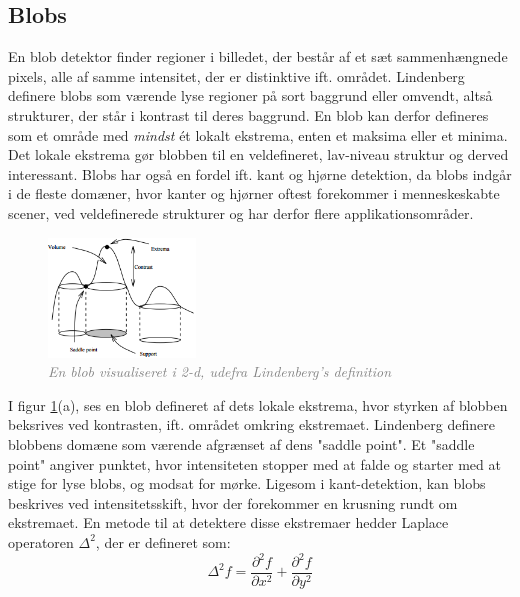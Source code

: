 \subsection{Blobs}
En blob detektor finder regioner i billedet, der består af et sæt sammenhængnede pixels, alle af samme intensitet, der er distinktive ift. området. Lindenberg \cite{blob} definere blobs som værende lyse regioner på sort baggrund eller omvendt, altså strukturer, der står i kontrast til deres baggrund. En blob kan derfor defineres som et område med \emph{mindst} ét lokalt ekstrema, enten et maksima eller et minima. Det lokale ekstrema gør blobben til en veldefineret, lav-niveau struktur og derved interessant. Blobs har også en fordel ift. kant og hjørne detektion, da blobs indgår i de fleste domæner, hvor kanter og hjørner oftest forekommer i menneskeskabte scener, ved veldefinerede strukturer og har derfor flere applikationsområder.
\begin{figure}[H]
    \centering
    \includegraphics[width=0.35\textwidth]{fig/11.png}
    \vspace{-0.5em}   
    \begin{center}
    \caption{\textcolor{gray}{\footnotesize \textit{
    En blob visualiseret i 2-d, udefra Lindenberg's definition \cite{blob}}}}
    \label{fig:lindblob}
     \end{center}
  \end{figure}
       \vspace{-2.7em}
\noindent
I figur \ref{fig:lindblob}(a), ses en blob defineret af dets lokale ekstrema, hvor styrken af blobben beksrives ved kontrasten, ift. området omkring ekstremaet. Lindenberg definere blobbens domæne som værende afgrænset af dens "saddle point". Et "saddle point" angiver punktet, hvor intensiteten stopper med at falde og starter med at stige for lyse blobs, og modsat for mørke. Ligesom i kant-detektion, kan blobs beskrives ved intensitetsskift, hvor der forekommer en krusning rundt om ekstremaet. En metode til at detektere disse ekstremaer hedder Laplace operatoren $\Delta^2$, der er defineret som:
\begin{equation}
\Delta^2 f = \dfrac{\partial^2 f}{\partial x^2}+\dfrac{\partial^2 f}{\partial y^2}
\end{equation}
